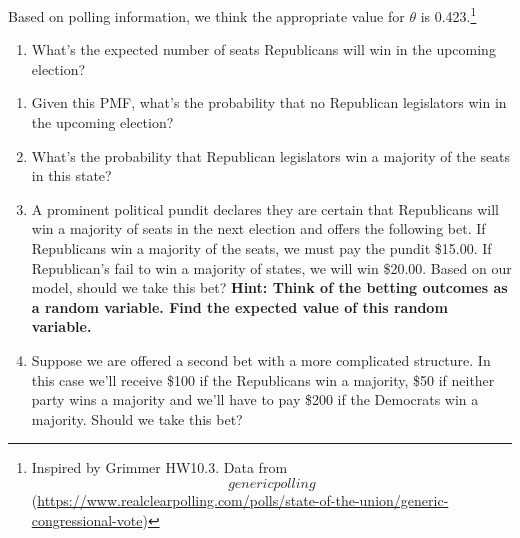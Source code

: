 \documentclass[
]{article}
\begin{document}
Based on polling information, we think the appropriate value for
\(\theta\) is 0.423.\footnote{Inspired by Grimmer HW10.3. Data from
  \[generic polling\](\url{https://www.realclearpolling.com/polls/state-of-the-union/generic-congressional-vote})}

\begin{enumerate}
\def\labelenumi{\alph{enumi}.}
\item
  What's the expected number of seats Republicans will win in the
  upcoming election?
\end{enumerate}

\hfill\break
\hfill\break
\hfill\break
\hfill\break
\hfill\break
\hfill\break
\hfill\break
\hfill\break
\hfill\break
\hfill\break

\begin{enumerate}
\def\labelenumi{\alph{enumi}.}
\item
  Given this PMF, what's the probability that no Republican legislators
  win in the upcoming election?

  \hfill\break
  \hfill\break
  \hfill\break
  \hfill\break
  \hfill\break
  \hfill\break
  \hfill\break
  \hfill\break
  \hfill\break
  \hfill\break
\item
  What's the probability that Republican legislators win a majority of
  the seats in this state?

  \hfill\break
  \hfill\break
  \hfill\break
  \hfill\break
  \hfill\break
  \hfill\break
  \hfill\break
\item
  A prominent political pundit declares they are certain that
  Republicans will win a majority of seats in the next election and
  offers the following bet. If Republicans win a majority of the seats,
  we must pay the pundit \$15.00. If Republican's fail to win a majority
  of states, we will win \$20.00. Based on our model, should we take
  this bet? \textbf{Hint: Think of the betting outcomes as a random
  variable. Find the expected value of this random variable.}

  \hfill\break
  \hfill\break
  \hfill\break
  \hfill\break
  \hfill\break
  \hfill\break
  \hfill\break
  \hfill\break
  \hfill\break
  \hfill\break
\item
  Suppose we are offered a second bet with a more complicated structure.
  In this case we'll receive \$100 if the Republicans win a majority,
  \$50 if neither party wins a majority and we'll have to pay \$200 if
  the Democrats win a majority. Should we take this bet?
\end{enumerate}
\end{document}
